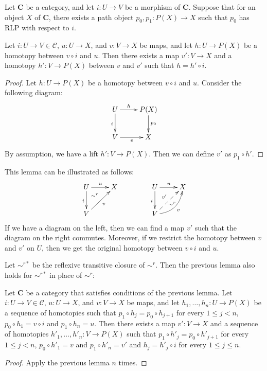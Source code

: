 \documentclass{tac}
\theoremstyle{definition}
\newcommand{\cof}{\mathcal{C}}
\newcommand{\cat}[1]{\mathbf{#1}}
\newcommand{\C}{\cat{C}}
\begin{document}
\begin{lem}
Let $\C$ be a category, and let $i : U \to V$ be a morphism of $\C$.
Suppose that for an object $X$ of $\C$, there exists a path object $p_0,p_1 : P(X) \to X$ such that $p_0$ has RLP with respect to $i$.

Let $i : U \to V \in \cof$, $u : U \to X$, and $v : V \to X$ be maps, and let $h : U \to P(X)$ be a homotopy between $v \circ i$ and $u$.
Then there exists a map $v' : V \to X$ and a homotopy $h' : V \to P(X)$ between $v$ and $v'$ such that $h = h' \circ i$.
\end{lem}
\begin{proof}
Let $h : U \to P(X)$ be a homotopy between $v \circ i$ and $u$.
Consider the following diagram:
\[ \xymatrix{ U \ar[r]^-h \ar[d]_i & P(X) \ar[d]^{p_0} \\
              V \ar[r]_v & X
            } \]
By assumption, we have a lift $h' : V \to P(X)$.
Then we can define $v'$ as $p_1 \circ h'$.
\end{proof}

This lemma can be illustrated as follows:
\[ \xymatrix{ U \ar[r]^u \ar[d]_i \ar@{}[dr]|(.3){\sim^r} & X \\
              V \ar[ur]_v &
            }
\qquad \qquad
   \xymatrix{ U \ar[r]^u \ar[d]_i \ar@{}[dr]|(.62){\sim^r} & X \\
              V \ar@{-->}[ur]^{v'} \ar@/_1pc/[ur]_v &
            } \]
If we have a diagram on the left, then we can find a map $v'$ such that the diagram on the right commutes.
Moreover, if we restrict the homotopy between $v$ and $v'$ on $U$, then we get the original homotopy between $v \circ i$  and $u$.

Let $\sim^{r*}$ be the reflexive transitive closure of $\sim^r$.
Then the previous lemma also holds for $\sim^{r*}$ in place of $\sim^r$:

\begin{lem}
Let $\C$ be a category that satisfies conditions of the previous lemma.
Let $i : U \to V \in \cof$, $u : U \to X$, and $v : V \to X$ be maps, and let $h_1, \ldots, h_n : U \to P(X)$ be a sequence of homotopies
such that $p_1 \circ h_j = p_0 \circ h_{j+1}$ for every $1 \leq j < n$, $p_0 \circ h_1 = v \circ i$ and $p_1 \circ h_n = u$.
Then there exists a map $v' : V \to X$ and a sequence of homotopies $h'_1, \ldots, h'_n : V \to P(X)$
such that $p_1 \circ h'_j = p_0 \circ h'_{j+1}$ for every $1 \leq j < n$, $p_0 \circ h'_1 = v$ and $p_1 \circ h'_n = v'$ and $h_j = h'_j \circ i$ for every $1 \leq j \leq n$.
\end{lem}
\begin{proof}
Apply the previous lemma $n$ times.
\end{proof}
\end{document}
